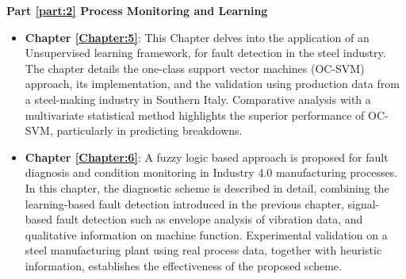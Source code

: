 \textbf{Part \textcolor{red}{\ref{part:2}} Process Monitoring and Learning}
\begin{itemize}
    \item \textbf{Chapter \textcolor{red}{\ref{Chapter:5}}}: This Chapter delves into the application of an Unsupervised learning framework, for fault detection in the steel industry. The chapter details the  one-class support vector machines (OC-SVM) approach, its implementation, and the validation using production data from a steel-making industry in Southern Italy. Comparative analysis with a multivariate statistical method highlights the superior performance of OC-SVM, particularly in predicting breakdowns.
    \item \textbf{Chapter \textcolor{red}{\ref{Chapter:6}}}: A fuzzy logic based approach is proposed for fault diagnosis and condition monitoring in Industry 4.0 manufacturing processes. In this chapter, the diagnostic scheme is described in detail, combining the learning-based fault detection introduced in the previous chapter, signal-based fault detection such as envelope analysis of vibration data, and qualitative information on machine function. Experimental validation on a steel manufacturing plant using real process data, together with heuristic information, establishes the effectiveness of the proposed scheme.
\end{itemize}

